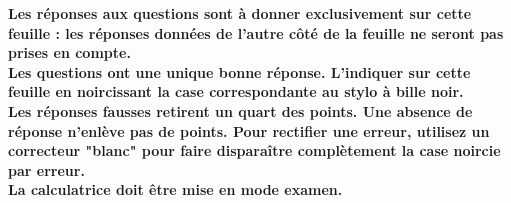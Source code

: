 \documentclass[a4paper]{article}
\begin{document}
{{\begin{center}
\bf Les réponses aux questions sont à donner exclusivement sur cette feuille : 
les réponses données de l'autre côté de la feuille ne seront pas prises en compte.
\\
Les questions ont une unique bonne réponse. L'indiquer sur cette feuille en noircissant la case correspondante au stylo à bille noir.\\
Les réponses fausses retirent un quart des points. Une absence de réponse n'enlève pas de points.
Pour rectifier une erreur, utilisez un correcteur "blanc" pour faire disparaître complètement la case noircie par erreur.\\
La calculatrice doit être mise en mode examen.
\
\end{center}
\formulaire

}
}
\end{document}
